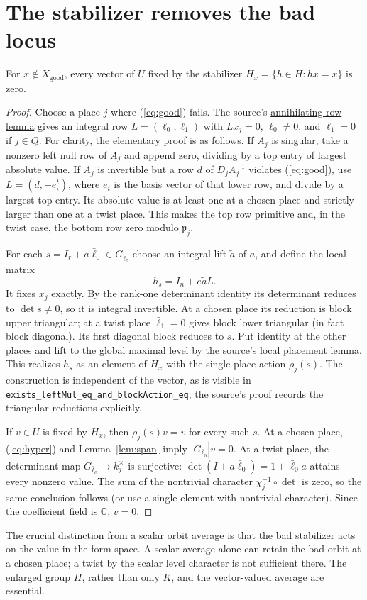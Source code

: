 \documentclass[11pt,letterpaper]{article}
\newcommand{\C}{\mathbb C}\newcommand{\Ocal}{\mathcal O}\newcommand{\p}{\mathfrak p}\newcommand{\G}{\mathrm{GL}}\newcommand{\SB}{\mathcal S}\newcommand{\supp}{\operatorname{supp}}\newcommand{\Tr}{\operatorname{Tr}}\newcommand{\id}{\mathrm{id}}\newcommand{\av}{\operatorname{Av}}\newcommand{\B}{\mathcal B}
\newcommand{\baseurl}{https://github.com/VladimirReshetnikov/ProveIt/blob/9050b04000647d588d0c78d945180abcd3b0bcf7/Analysis/GeneralizedRiemannHypothesis/}
\newcommand{\src}[3]{\href{\baseurl Lean/grh/src/#1.lean\#L#2}{#3}}
\newcommand{\bottomref}[2]{\src{New/OneLift/FalseLifts/BottomOfTower}{#1}{#2}}
\begin{document}
\section{The stabilizer removes the bad locus}
\begin{lemma}\label{lem:bad}
For $x\notin X_{\mathrm{good}}$, every vector of $U$ fixed by the stabilizer $H_x=\{h\in H:hx=x\}$ is zero.
\end{lemma}
\begin{proof}
Choose a place $j$ where (\ref{eq:good}) fails. The source's \bottomref{365}{annihilating-row lemma} gives an integral row $L=(\ell_0,\ell_1)$ with $Lx_j=0$, $\bar\ell_0\ne0$, and $\bar\ell_1=0$ if $j\in Q$. For clarity, the elementary proof is as follows. If $A_j$ is singular, take a nonzero left null row of $A_j$ and append zero, dividing by a top entry of largest absolute value. If $A_j$ is invertible but a row $d$ of $D_jA_j^{-1}$ violates (\ref{eq:good}), use $L=(d,-e_i^t)$, where $e_i$ is the basis vector of that lower row, and divide by a largest top entry. Its absolute value is at least one at a chosen place and strictly larger than one at a twist place. This makes the top row primitive and, in the twist case, the bottom row zero modulo $\p_j$.

For each $s=I_r+a\bar\ell_0\in G_{\bar\ell_0}$ choose an integral lift $\tilde a$ of $a$, and define the local matrix
\[
 h_s=I_n+e\tilde a L.
\]
It fixes $x_j$ exactly. By the rank-one determinant identity its determinant reduces to $\det s\ne0$, so it is integral invertible. At a chosen place its reduction is block upper triangular; at a twist place $\bar\ell_1=0$ gives block lower triangular (in fact block diagonal). Its first diagonal block reduces to $s$. Put identity at the other places and lift to the global maximal level by the source's local placement lemma. This realizes $h_s$ as an element of $H_x$ with the single-place action $\rho_j(s)$. The construction is independent of the vector, as is visible in \bottomref{1376}{\texttt{exists\_leftMul\_eq\_and\_blockAction\_eq}}; the source's proof records the triangular reductions explicitly.

If $v\in U$ is fixed by $H_x$, then $\rho_j(s)v=v$ for every such $s$. At a chosen place, (\ref{eq:hyper}) and Lemma~\ref{lem:span} imply $|G_{\bar\ell_0}|v=0$. At a twist place, the determinant map $G_{\bar\ell_0}\to k_j^\times$ is surjective: $\det(I+a\bar\ell_0)=1+\bar\ell_0 a$ attains every nonzero value. The sum of the nontrivial character $\chi_j^{-1}\circ\det$ is zero, so the same conclusion follows (or use a single element with nontrivial character). Since the coefficient field is $\C$, $v=0$.
\end{proof}
The crucial distinction from a scalar orbit average is that the bad stabilizer acts on the value in the form space. A scalar average alone can retain the bad orbit at a chosen place; a twist by the scalar level character is not sufficient there. The enlarged group $H$, rather than only $K$, and the vector-valued average are essential.
\end{document}
